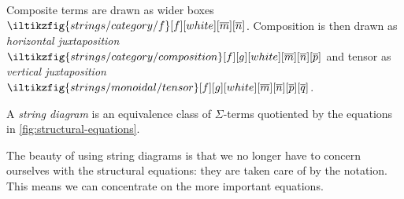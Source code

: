 Composite terms are drawn as wider boxes \(
    \iltikzfig{strings/category/f}[f][white][\overline{m}][\overline{n}]
\).
Composition is then drawn as \emph{horizontal juxtaposition} \(
    \iltikzfig{strings/category/composition}[f][g][white][\overline{m}][\overline{n}][\overline{p}]
\) and tensor as \emph{vertical juxtaposition} \(
    \iltikzfig{strings/monoidal/tensor}[f][g][white][\overline{m}][\overline{n}][\overline{p}][\overline{q}]
\).

\begin{definition}
    A \emph{string diagram} is an equivalence class of \(\Sigma\)-terms
    quotiented by the equations in \cref{fig:structural-equations}.
\end{definition}

The beauty of using string diagrams is that we no longer have to concern
ourselves with the structural equations: they are taken care of by the notation.
This means we can concentrate on the more important equations.

